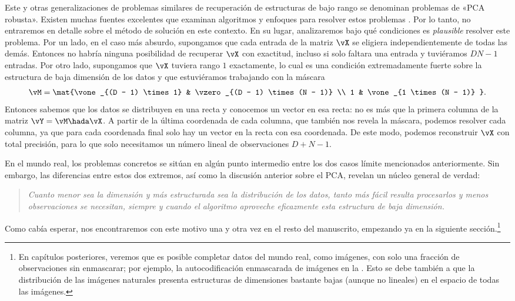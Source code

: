 \documentclass[../../book-main.tex]{subfiles}
\begin{document}
Este y otras generalizaciones de problemas similares de recuperación de estructuras de bajo rango
se denominan problemas de «PCA robusta». Existen
muchas fuentes excelentes que examinan algoritmos y enfoques para
resolver estos problemas \cite{Wright-Ma-2022}. Por lo tanto, no entraremos
en detalle sobre el método de solución en este contexto. En su lugar, analizaremos bajo qué
condiciones es \textit{plausible} resolver este problema. Por un lado,
en el caso más absurdo, supongamos que cada entrada de la matriz
\(\vX\) se eligiera independientemente de todas las demás. Entonces
no habría ninguna posibilidad de recuperar \(\vX\) con exactitud, incluso si solo faltara una entrada
y tuviéramos \(DN - 1\) entradas. Por otro lado,
supongamos que \(\vX\) tuviera rango $1$ exactamente, lo cual es una
condición extremadamente fuerte sobre la estructura de baja dimensión de los
datos y que estuviéramos trabajando con la máscara
\begin{equation}
    \vM = \mat{\vone_{(D - 1) \times 1} & \vzero_{(D - 1) \times (N -
    1)} \\ 1 & \vone_{1 \times (N - 1)} }.
\end{equation}
Entonces sabemos que los datos se distribuyen en una recta y conocemos un vector en
esa recta: no es más que la primera columna de la matriz \(\vY = \vM
\hada \vX\). A partir de la última coordenada de cada columna, que también nos revela
la máscara, podemos resolver cada columna, ya que para cada coordenada final
solo hay un vector en la recta con esa coordenada. De este modo, podemos 
reconstruir \(\vX\) con total precisión, para lo que solo necesitamos un número 
lineal de observaciones \(D + N - 1\).

En el mundo real, los problemas concretos se sitúan en algún punto intermedio entre los dos
casos límite mencionados anteriormente. Sin embargo, las diferencias entre estos dos
extremos, así como la discusión anterior sobre el PCA, revelan un
núcleo general de verdad:
\begin{quote}
    \centering
    \textit{Cuanto menor sea la dimensión y más estructurada sea la distribución de los datos,
        tanto más fácil resulta procesarlos y menos
        observaciones se necesitan, siempre y cuando el algoritmo aproveche eficazmente
    esta estructura de baja dimensión.}
\end{quote}
Como cabía esperar, nos encontraremos con este motivo una y otra vez en
el resto del manuscrito, empezando ya en la siguiente sección.\footnote{En capítulos 
    posteriores, veremos que es posible completar datos del mundo real, como imágenes, 
    con solo una fracción de observaciones sin enmascarar; por ejemplo, la autocodificación 
    enmascarada de imágenes en la . Esto se debe también a que la 
    distribución de las imágenes naturales presenta estructuras de dimensiones bastante bajas 
    (aunque no lineales) en el espacio de todas las imágenes.}
\end{document}
